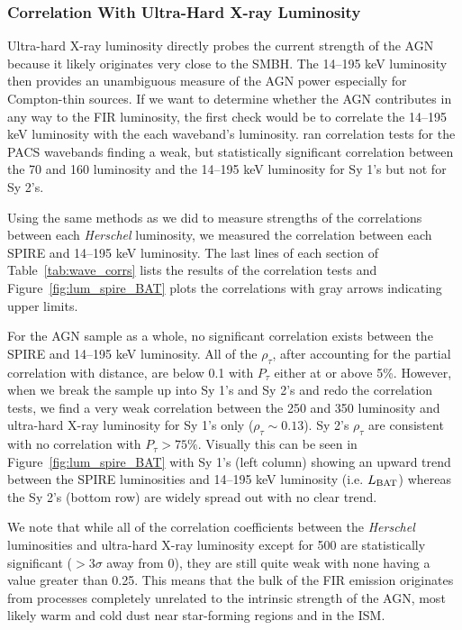 \subsubsection{Correlation With Ultra-Hard X-ray Luminosity}
Ultra-hard X-ray luminosity directly probes the current strength of the AGN because it likely originates very close to the SMBH. The 14--195 keV luminosity then provides an unambiguous measure of the AGN power especially for Compton-thin sources. If we want to determine whether the AGN contributes in any way to the FIR luminosity, the first check would be to correlate the 14--195 keV luminosity with the each waveband's luminosity. \citet{Melendez:2014yu} ran correlation tests for the PACS wavebands finding a weak, but statistically significant correlation between the 70 and 160 \um{} luminosity and the 14--195 keV luminosity for Sy 1's but not for Sy 2's.

Using the same methods as we did to measure strengths of the correlations between each \textit{Herschel} luminosity, we measured the correlation between each SPIRE and 14--195 keV luminosity. The last lines of each section of Table~\ref{tab:wave_corrs} lists the results of the correlation tests and Figure~\ref{fig:lum_spire_BAT} plots the correlations with gray arrows indicating upper limits.

For the AGN sample as a whole, no significant correlation exists between the SPIRE and 14--195 keV luminosity. All of the $\rho_{\tau}$, after accounting for the partial correlation with distance, are below 0.1 with $P_{\tau}$ either at or above 5\%. However, when we break the sample up into Sy 1's and Sy 2's and redo the correlation tests, we find a very weak correlation between the 250 and 350 \um{} luminosity and ultra-hard X-ray luminosity for Sy 1's only ($\rho_{\tau}\sim0.13$). Sy 2's $\rho_{\tau}$ are consistent with no correlation with $P_{\tau}>75\%$. Visually this can be seen in Figure~\ref{fig:lum_spire_BAT} with Sy 1's (left column) showing an upward trend between the SPIRE luminosities and 14--195 keV luminosity (i.e. $L_{\rm BAT}$) whereas the Sy 2's (bottom row) are widely spread out with no clear trend.

We note that while all of the correlation coefficients between the \textit{Herschel} luminosities and ultra-hard X-ray luminosity except for 500 \um{} are statistically significant ($>3\sigma$ away from 0), they are still quite weak with none having a value greater than 0.25. This means that the bulk of the FIR emission originates from processes completely unrelated to the intrinsic strength of the AGN, most likely warm and cold dust near star-forming regions and in the ISM.
  
  
